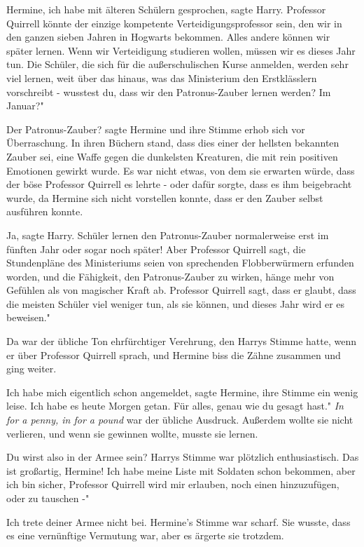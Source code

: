 \glqq Hermine, ich habe mit älteren Schülern gesprochen\grqq{}, sagte Harry.
\glqq Professor Quirrell könnte der einzige kompetente Verteidigungsprofessor
sein, den wir in den ganzen sieben Jahren in Hogwarts bekommen. Alles andere
können wir später lernen. Wenn wir Verteidigung studieren wollen, müssen wir es
dieses Jahr tun. Die Schüler, die sich für die außerschulischen Kurse anmelden,
werden sehr viel lernen, weit über das hinaus, was das Ministerium den
Erstklässlern vorschreibt - wusstest du, dass wir den Patronus-Zauber lernen
werden? Im Januar?"

\glqq Der Patronus-Zauber?\grqq{} sagte Hermine und ihre Stimme erhob sich vor
Überraschung. In ihren Büchern stand, dass dies einer der hellsten bekannten
Zauber sei, eine Waffe gegen die dunkelsten Kreaturen, die mit rein positiven
Emotionen gewirkt wurde. Es war nicht etwas, von dem sie erwarten würde, dass
der böse Professor Quirrell es lehrte - oder dafür sorgte, dass es ihm
beigebracht wurde, da Hermine sich nicht vorstellen konnte, dass er den Zauber
selbst ausführen konnte.

\glqq Ja\grqq{}, sagte Harry. \glqq Schüler lernen den Patronus-Zauber
normalerweise erst im fünften Jahr oder sogar noch später! Aber Professor
Quirrell sagt, die Stundenpläne des Ministeriums seien von sprechenden
Flobberwürmern erfunden worden, und die Fähigkeit, den Patronus-Zauber zu
wirken, hänge mehr von Gefühlen als von magischer Kraft ab. Professor Quirrell
sagt, dass er glaubt, dass die meisten Schüler viel weniger tun, als sie können,
und dieses Jahr wird er es beweisen."

Da war der übliche Ton ehrfürchtiger Verehrung, den Harrys Stimme hatte, wenn er
über Professor Quirrell sprach, und Hermine biss die Zähne zusammen und ging
weiter.

\glqq Ich habe mich eigentlich schon angemeldet\grqq{}, sagte Hermine, ihre
Stimme ein wenig leise. \glqq Ich habe es heute Morgen getan. Für alles, genau
wie du gesagt hast." \emph{ In for a penny, in for a pound} war der übliche
Ausdruck. Außerdem wollte sie nicht verlieren, und wenn sie gewinnen wollte,
musste sie lernen.

\glqq Du wirst also in der Armee sein?\grqq{} Harrys Stimme war plötzlich
enthusiastisch. \glqq Das ist großartig, Hermine! Ich habe meine Liste mit
Soldaten schon bekommen, aber ich bin sicher, Professor Quirrell wird mir
erlauben, noch einen hinzuzufügen, oder zu tauschen -"

\glqq Ich trete deiner Armee nicht bei.\grqq{} Hermine's Stimme war scharf. Sie
wusste, dass es eine vernünftige Vermutung war, aber es ärgerte sie trotzdem.

